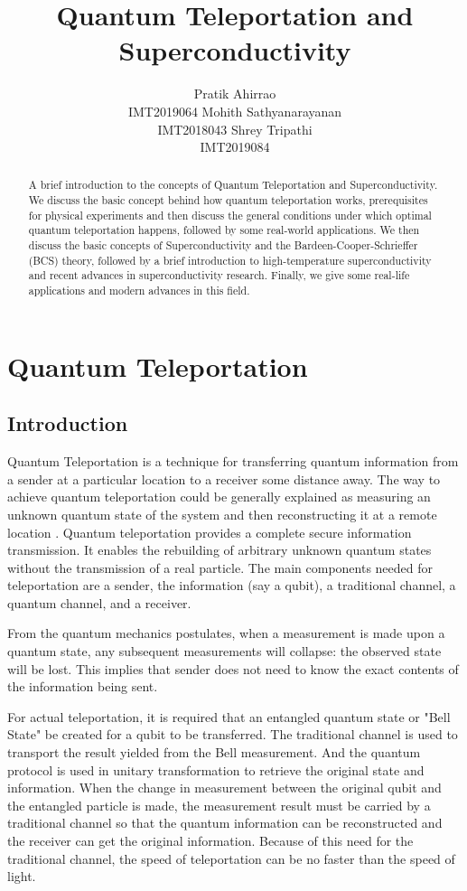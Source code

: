 \documentclass{article}
\title{Quantum Teleportation and Superconductivity}
\author{
    {\hspace{0.5mm}Pratik Ahirrao} \\
	IMT2019064
	\And
	{\hspace{0.5mm}Mohith Sathyanarayanan} \\
	IMT2018043
	\And
	{\hspace{0.5mm}Shrey Tripathi} \\
	IMT2019084
}
\begin{document}
\maketitle

\begin{abstract}
    A brief introduction to the concepts of Quantum Teleportation and Superconductivity. We discuss the basic concept behind how quantum teleportation works, prerequisites for physical experiments and then discuss the general conditions under which optimal quantum teleportation happens, followed by some real-world applications. We then discuss the basic concepts of Superconductivity and the Bardeen-Cooper-Schrieffer (BCS) theory, followed by a brief introduction to high-temperature superconductivity and recent advances in superconductivity research. Finally, we give some real-life applications and modern advances in this field.
\end{abstract}

\tableofcontents
\newpage

\section{Quantum Teleportation}

\subsection{Introduction}
Quantum Teleportation is a technique for transferring quantum information from a sender at a particular location to a receiver some distance away. The way to achieve quantum teleportation could be generally explained as measuring an unknown quantum state of the system and then reconstructing it at a remote location . Quantum teleportation provides a complete secure information transmission. It enables the rebuilding of arbitrary unknown quantum states without the transmission of a real particle. The main components needed for teleportation are a sender, the information (say a qubit), a traditional channel, a quantum channel, and a receiver.\cite{qtwiki} 

From the quantum mechanics postulates, when a measurement is made upon a quantum state, any subsequent measurements will collapse: the observed state will be lost. This implies that sender does not need to know the exact contents of the information being sent. \cite{qtwiki}

For actual teleportation, it is required that an entangled quantum state or "Bell State" be created for a qubit to be transferred. The traditional channel is used to transport the result yielded from the Bell measurement. And the quantum protocol is used in unitary transformation to retrieve the original state and information. When the change in measurement between the original qubit and the entangled particle is made, the measurement result must be carried by a traditional channel so that the quantum information can be reconstructed and the receiver can get the original information. Because of this need for the traditional channel, the speed of teleportation can be no faster than the speed of light. \cite{qtapplications}
\end{document}
